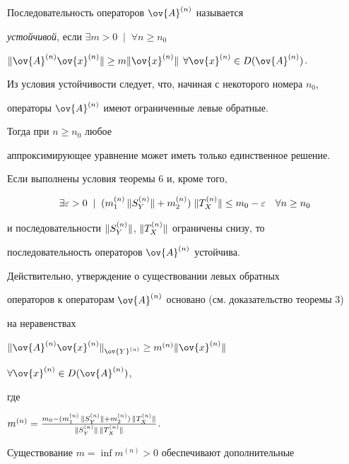 Последовательность операторов $\ov{A}^{(n)}$ называется


{\it устойчивой}, если $\exists m>0 \;\mid\; \forall n\ge n_0$


$\nr{\ov{A}^{(n)}\ov{x}^{(n)}}\ge m\nr{\ov{x}^{(n)}}$ $\forall


\ov{x}^{(n)}\in D(\ov{A}^{(n)})$.


Из условия устойчивости следует, что, начиная с некоторого номера $n_0$,


операторы $\ov{A}^{(n)}$ имеют ограниченные левые обратные.


Тогда при $n\ge n_0$ любое


аппроксимирующее уравнение может иметь только единственное решение.





\begin{cornonum}


Если выполнены условия теоремы 6 и, кроме того,


$$


\exists \varepsilon >0 \;\mid\; (m^{(n)}_1\,\nr{S^{(n)}_Y}+m^{(n)}_2)\;


\nr{T^{(n)}_X}


\le m_0-\varepsilon \quad \forall n\ge n_0


$$


и последовательности $\| {S^{(n)}_Y} \|$, $\| {T^{(n)}_X} \|$ ограничены снизу, то


последовательность операторов $\ov{A}^{(n)}$ устойчива.


\end{cornonum}





Действительно, утверждение о существовании левых обратных


операторов к операторам $\ov{A}^{(n)}$ основано (см. доказательство теоремы 3)


на неравенствах


$\nr{\ov{A}^{(n)}\ov{x}^{(n)}}_{\ov{Y}^{(n)}} \ge m^{(n)}\nr{\ov{x}^{(n)}}$


$\forall \ov{x}^{(n)} \in D(\ov{A}^{(n)})$,


где


$m^{(n)}=\frac{m_0-(m^{(n)}_1\,\nr{S^{(n)}_Y}+m^{(n)}_2)\,\nr{T^{(n)}_X}}


{\nr{S^{(n)}_Y}\,\nr{T^{(n)}_X}}$.


Существование $m=\inf m^{(n)}>0$ обеспечивают дополнительные



